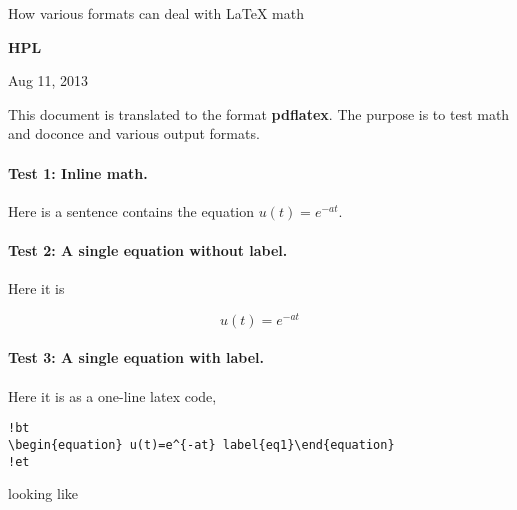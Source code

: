 \documentclass[%
oneside,                 %
final,                   %
10pt]{article}
\begin{document}






\begin{center}
{\LARGE\bf
\begin{spacing}{1.25}
How various formats can deal with {\LaTeX} math
\end{spacing}
}
\end{center}


\begin{center}
{\bf HPL${}^{}$} \\ [0mm]
\end{center}

\begin{center}
\end{center}


\begin{center}
Aug 11, 2013
\end{center}

\vspace{1cm}



This document is translated to the format \textbf{pdflatex}. The purpose is to
test math and doconce and various output formats.

\paragraph{Test 1: Inline math.}
Here is a sentence contains the equation $u(t)=e^{-at}$.

\paragraph{Test 2: A single equation without label.}
Here it is

\[ u(t)=e^{-at} \]

\paragraph{Test 3: A single equation with label.}
Here it is as a one-line
latex code,

\begin{Verbatim}[numbers=none,fontsize=\fontsize{9pt}{9pt},baselinestretch=0.95]
!bt
\begin{equation} u(t)=e^{-at} label{eq1}\end{equation}
!et
\end{Verbatim}
looking like
\end{document}
